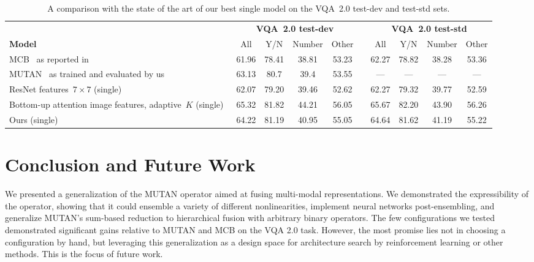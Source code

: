 \begin{table*}[!t]
\centering
\caption{A comparison with the state of the art of our best single model on the
         VQA~2.0 test-dev and test-std sets.}
\begin{tabular}{l*{9}{c}}
& \multicolumn{4}{c}{\textbf{VQA~2.0 test-dev}} & & \multicolumn{4}{c}{\textbf{VQA~2.0 test-std}} \\
\textbf{Model} & All & Y/N & Number & Other & & All & Y/N & Number & Other \\
\midrule
MCB~\cite{fukui2016multimodalCB} as reported in~\cite{goyal2017making} & 61.96 & 78.41 & 38.81 & 53.23 & & 62.27 & 78.82 & 38.28 & 53.36 \\
MUTAN~\cite{ben2017mutan} as trained and evaluated by us & 63.13 & 80.7 & 39.4 & 53.55 & & --- & --- & --- & --- \\
ResNet features~$7 \times 7$ (single)~\cite{teney2017tips} & 62.07 & 79.20 & 39.46 & 52.62 & & 62.27 & 79.32 & 39.77 & 52.59 \\
Bottom-up attention image features, adaptive~$K$ (single)~\cite{teney2017tips} & 65.32 & 81.82 & 44.21 & 56.05 & & 65.67 & 82.20 & 43.90 & 56.26 \\
\midrule
Ours (single) & 64.22 & 81.19 & 40.95 & 55.05 & & 64.64 & 81.62 & 41.19 & 55.22 \\
\midrule
\end{tabular}
\label{tab:sota-comparison}
\end{table*}


\section{Conclusion and Future Work}

We presented a generalization of the MUTAN operator aimed at fusing multi-modal
representations. We demonstrated the expressibility of the operator, showing
that it could ensemble a variety of different nonlinearities, implement neural
networks post-ensembling, and generalize MUTAN's sum-based reduction to
hierarchical fusion with arbitrary binary operators. The few configurations we
tested demonstrated significant gains relative to MUTAN and MCB on the VQA 2.0
task. However, the most promise lies not in choosing a configuration by hand,
but leveraging this generalization as a design space for architecture search by
reinforcement learning or other methods. This is the focus of future work.

\FloatBarrier{}
